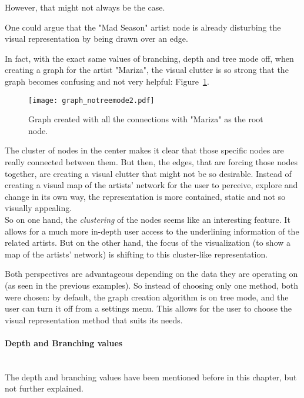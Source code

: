       However, that might not always be the case.

      One could argue that the "Mad Season" artist node is already disturbing the visual representation by being drawn over an edge.

      In fact, with the exact same values of branching, depth and tree mode off, when creating a graph for the artist "Mariza", the visual clutter is so strong that the graph becomes confusing and not very helpful: Figure~\ref{fig:graph_notreemode2}.

      \begin{figure}[tb]
        \begin{center}
          \texttt{[image: graph\_notreemode2.pdf]}
        \end{center}
        \caption{Graph created with all the connections with "Mariza" as the root node.}
        \label{fig:graph_notreemode2}
      \end{figure}

      The cluster of nodes in the center makes it clear that those specific nodes are really connected between them. 
      But then, the edges, that are forcing those nodes together, are creating a visual clutter that might not be so desirable.
      Instead of creating a visual map of the artists' network for the user to perceive, explore and change in its own way, the representation is more contained, static and not so visually appealing.
      \hfill \\

      So on one hand, the \emph{clustering} of the nodes seems like an interesting feature.
      It allows for a much more in-depth user access to the underlining information of the related artists.
      But on the other hand, the focus of the visualization (to show a map of the artists' network) is shifting to this cluster-like representation.

      Both perspectives are advantageous depending on the data they are operating on (as seen in the previous examples).
      So instead of choosing only one method, both were chosen: by default, the graph creation algorithm is on tree mode, and the user can turn it off from a settings menu.
      This allows for the user to choose the visual representation method that suits its needs.

      \paragraph{Depth and Branching values} \hfill \\
      The depth and branching values have been mentioned before in this chapter, but not further explained.

